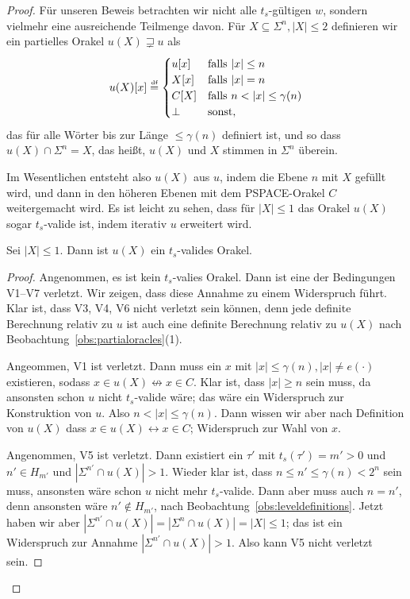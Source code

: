 \begin{proof}
Für unseren Beweis betrachten wir nicht alle $t_{s}$-gültigen $w$, sondern vielmehr eine ausreichende Teilmenge davon.
Für $X \subseteq \Sigma^n, |X|\leq 2$ definieren wir ein partielles Orakel $u(X)\sqsupsetneq u$ als
\[
    u(X)[x] \defeq \begin{cases} u[x] & \text{falls $|x|\leq n$}\\
    X[x] & \text{falls $|x|=n$}\\
    C[X] & \text{falls $n<|x|\leq \gamma(n)$} \\ \bot & \text{sonst}, \end{cases}
\]
das für alle Wörter bis zur Länge $\leq\gamma(n)$ definiert ist, und so dass $u(X) \cap \Sigma^n = X$, das heißt, $u(X)$ und $X$ stimmen in $\Sigma^n$ überein.

Im Wesentlichen entsteht also $u(X)$ aus $u$, indem die Ebene $n$ mit $X$ gefüllt wird, und dann in den höheren Ebenen mit dem PSPACE-Orakel $C$ weitergemacht wird.
Es ist leicht zu sehen, dass für $|X|\leq 1$ das Orakel $u(X)$ sogar $t_{s}$-valide ist, indem iterativ $u$ erweitert wird.

\begin{claim}
    Sei $|X|\leq 1$. Dann ist $u(X)$ ein $t_{s}$-valides Orakel.
\end{claim}
\begin{proof}
    Angenommen, es ist kein $t_{s}$-valies Orakel. Dann ist eine der Bedingungen V1--V7 verletzt. Wir zeigen, dass diese Annahme zu einem Widerspruch führt.
    Klar ist, dass V3, V4, V6 nicht verletzt sein können, denn jede definite Berechnung relativ zu $u$ ist auch eine definite Berechnung relativ zu $u(X)$ nach Beobachtung~\ref{obs:partialoracles}(1).

    Angeommen, V1 ist verletzt. Dann muss ein $x$ mit $|x|\leq \gamma(n), |x|\neq e(\cdot)$ existieren, sodass $x\in u(X) \not\leftrightarrow x\in C$.
    Klar ist, dass $|x|\geq n$ sein muss, da ansonsten schon $u$ nicht $t_{s}$-valide wäre; das wäre ein Widerspruch zur Konstruktion von $u$.
    Also $n<|x|\leq \gamma(n)$. Dann wissen wir aber nach Definition von $u(X)$ dass $x\in u(X) \leftrightarrow x\in C$; Widerspruch zur Wahl von $x$.

    Angenommen, V5 ist verletzt. Dann existiert ein $\tau'$ mit $t_{s}(\tau')=m'>0$ und $n'\in H_{m'}$ und $|\Sigma^{n'}\cap u(X)|>1$. Wieder klar ist, dass $n\leq n'\leq\gamma(n)<2^n$ sein muss, ansonsten wäre schon $u$ nicht mehr $t_{s}$-valide.
    Dann aber muss auch $n=n'$, denn ansonsten wäre $n'\not\in H_{m'}$, nach Beobachtung~\ref{obs:leveldefinitions}.
    Jetzt haben wir aber $|\Sigma^{n'}\cap u(X)|=|\Sigma^n\cap u(X)| = |X|\leq 1$; das ist ein Widerspruch zur Annahme $|\Sigma^{n'}\cap u(X)|>1$. Also kann V5 nicht verletzt sein. 


\end{proof}
\end{proof}
